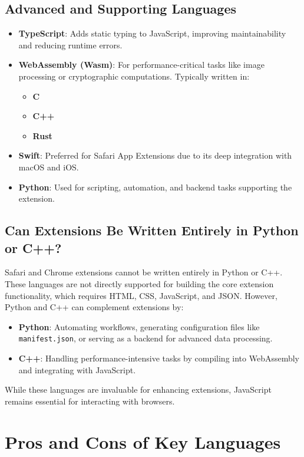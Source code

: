 \documentclass[a4paper,12pt]{article}
\begin{document}
\subsection{Advanced and Supporting Languages}
\begin{itemize}
    \item \textbf{TypeScript}: Adds static typing to JavaScript, improving maintainability and reducing runtime errors.
    \item \textbf{WebAssembly (Wasm)}: For performance-critical tasks like image processing or cryptographic computations. Typically written in:
          \begin{itemize}
              \item \textbf{C}
              \item \textbf{C++}
              \item \textbf{Rust}
          \end{itemize}
    \item \textbf{Swift}: Preferred for Safari App Extensions due to its deep integration with macOS and iOS.
    \item \textbf{Python}: Used for scripting, automation, and backend tasks supporting the extension.
\end{itemize}

\subsection{Can Extensions Be Written Entirely in Python or C++?}
Safari and Chrome extensions cannot be written entirely in Python or C++. These languages are not directly supported for building the core extension functionality, which requires HTML, CSS, JavaScript, and JSON. However, Python and C++ can complement extensions by:
\begin{itemize}
    \item \textbf{Python}: Automating workflows, generating configuration files like \texttt{manifest.json}, or serving as a backend for advanced data processing.
    \item \textbf{C++}: Handling performance-intensive tasks by compiling into WebAssembly and integrating with JavaScript.
\end{itemize}
While these languages are invaluable for enhancing extensions, JavaScript remains essential for interacting with browsers.

\section{Pros and Cons of Key Languages}
\end{document}
